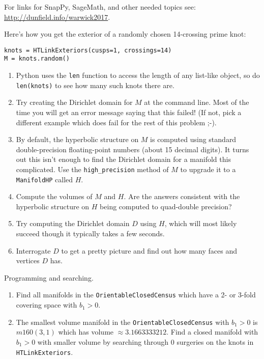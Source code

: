 \documentclass[tikz, a4paper]{nmd/hw}
\begin{document}

For links for SnapPy, SageMath, and other needed topics see: \url{http://dunfield.info/warwick2017}.

\begin{problems}
  \item Here's how you get the exterior of a randomly chosen 14-crossing prime knot:

  \texttt{knots = HTLinkExteriors(cusps=1, crossings=14)} \\ 
  \texttt{M = knots.random()}

  \begin{enumerate}
    \item Python uses the \texttt{len} function to access the length of any
      list-like object, so do \texttt{len(knots)} to see how many such
      knots there are.

    \item Try creating the Dirichlet domain for $M$ at the command
      line.  Most of the time you will get an error message saying
      that this failed!  (If not, pick a different example which does
      fail for the rest of this problem ;-).

    \item By default, the hyperbolic structure on $M$ is computed
      using standard double-precision floating-point numbers (about 15
      decimal digits).  It turns out this isn't enough to find the
      Dirichlet domain for a manifold this complicated.  Use the
      \texttt{high\_precision} method of $M$ to upgrade it to a
      \texttt{ManifoldHP} called $H$. 

    \item Compute the volumes of $M$ and $H$.  Are the answers
      consistent with the hyperbolic structure on $H$ being computed
      to quad-double precision?

    \item Try computing the Dirichlet domain $D$ using $H$, which
      will most likely succeed though it typically takes a few
      seconds. 

    \item Interrogate $D$ to get a pretty picture and find out how
      many faces and vertices $D$ has. 

    \end{enumerate}
    
  
  \item Programming and searching.
    \begin{enumerate}
      \item Find all manifolds in the \texttt{OrientableClosedCensus}
        which have a 2- or 3-fold covering space with $b_1 > 0$.  
      \item The smallest volume manifold in the
        \texttt{OrientableClosedCensus} with $b_1 > 0$ is $m160(3,1)$
        which has volume $\approx 3.1663333212$.  Find a closed
        manifold with $b_1 > 0$ with smaller volume by searching
        through 0 surgeries on the knots in \texttt{HTLinkExteriors}.  


\end{enumerate}
\end{problems}
\end{document}
